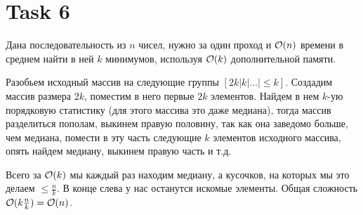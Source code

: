 \section{Task 6}
\begin{task}
    Дана последовательность из $n$ чисел, нужно за один проход и $\mathcal{O}(n)$ времени в среднем найти в ней $k$ минимумов, используя $\mathcal{O}(k)$ дополнительной памяти.
\end{task}

\begin{solution}
    Разобьем исходный массив на следующие группы $[2k|k|\ldots|\leq k]$. Создадим массив размера $2k$, поместим в него первые $2k$ элементов. Найдем в нем $k$-ую порядковую статистику (для этого массива это даже медиана), тогда массив разделиться пополам, выкинем правую половину, так как она заведомо больше, чем медиана, помести в эту часть следующие $k$ элементов исходного массива, опять найдем медиану, выкинем правую часть и т.д.
    
    Всего за $\mathcal{O}(k)$ мы каждый раз находим медиану, а кусочков, на которых мы это делаем $\leq \frac{n}{k}$. В конце слева у нас останутся искомые элементы. Общая сложность $\mathcal{O}(k\frac{n}{k}) = \mathcal{O}(n)$.
\end{solution}